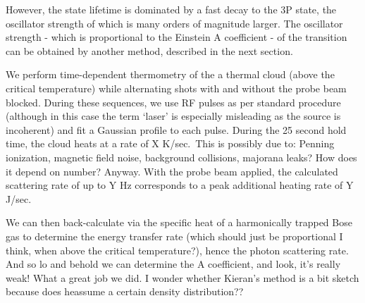 	However, the state lifetime is dominated by a fast decay to the 3P state, the oscillator strength of which is many orders of magnitude larger.
	The oscillator strength - which is proportional to the Einstein A coefficient - of the transition can be obtained by another method, described in the next section.

	We perform time-dependent thermometry of the a thermal cloud (above the critical temperature) while alternating shots with and without the probe beam blocked.
	During these sequences, we use RF pulses as per standard procedure (although in this case the term `laser' is especially misleading as the source is incoherent) and fit a Gaussian profile to each pulse.
	During the 25 second hold time, the cloud heats at a rate of X K/sec.~This is possibly due to: Penning ionization, magnetic field noise, background collisions, majorana leaks? How does it depend on number? Anyway.
	With the probe beam applied, the calculated scattering rate of up to Y Hz corresponds to a peak additional heating rate of Y J/sec.

	We can then back-calculate via the specific heat of a harmonically trapped Bose gas to determine the energy transfer rate (which should just be proportional I think, when above the critical temperature?), hence the photon scattering rate.
	And so lo and behold we can determine the A coefficient, and look, it's really weak! What a great job we did.
	I wonder whether Kieran's method is a bit sketch because does heassume a certain density distribution??







